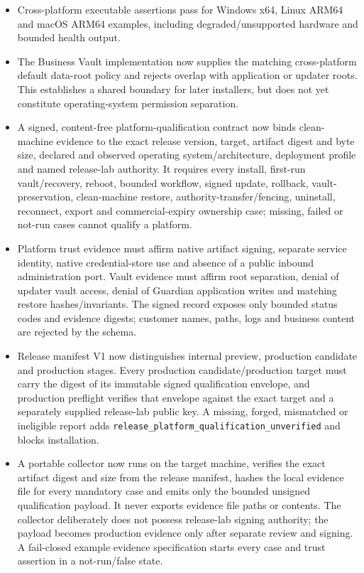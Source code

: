\documentclass[11pt]{article}
\newcommand{\code}[1]{\texttt{#1}}
\begin{document}
\begin{itemize}
  \item Cross-platform executable assertions pass for Windows x64, Linux ARM64 and macOS ARM64 examples, including degraded/unsupported hardware and bounded health output.
  \item The Business Vault implementation now supplies the matching cross-platform default data-root policy and rejects overlap with application or updater roots. This establishes a shared boundary for later installers, but does not yet constitute operating-system permission separation.
  \item A signed, content-free platform-qualification contract now binds clean-machine evidence to the exact release version, target, artifact digest and byte size, declared and observed operating system/architecture, deployment profile and named release-lab authority. It requires every install, first-run vault/recovery, reboot, bounded workflow, signed update, rollback, vault-preservation, clean-machine restore, authority-transfer/fencing, uninstall, reconnect, export and commercial-expiry ownership case; missing, failed or not-run cases cannot qualify a platform.
  \item Platform trust evidence must affirm native artifact signing, separate service identity, native credential-store use and absence of a public inbound administration port. Vault evidence must affirm root separation, denial of updater vault access, denial of Guardian application writes and matching restore hashes/invariants. The signed record exposes only bounded status codes and evidence digests; customer names, paths, logs and business content are rejected by the schema.
  \item Release manifest V1 now distinguishes internal preview, production candidate and production stages. Every production candidate/production target must carry the digest of its immutable signed qualification envelope, and production preflight verifies that envelope against the exact target and a separately supplied release-lab public key. A missing, forged, mismatched or ineligible report adds \code{release\_platform\_qualification\_unverified} and blocks installation.
  \item A portable collector now runs on the target machine, verifies the exact artifact digest and size from the release manifest, hashes the local evidence file for every mandatory case and emits only the bounded unsigned qualification payload. It never exports evidence file paths or contents. The collector deliberately does not possess release-lab signing authority; the payload becomes production evidence only after separate review and signing. A fail-closed example evidence specification starts every case and trust assertion in a not-run/false state.

\end{itemize}
\end{document}
